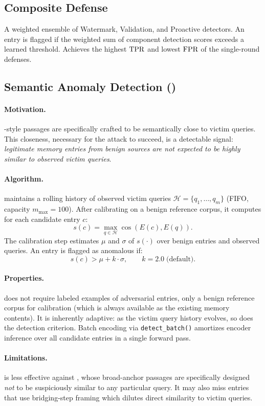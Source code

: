 \subsection{Composite Defense}

A weighted ensemble of Watermark, Validation, and Proactive detectors.
An entry is flagged if the weighted sum of component detection scores exceeds
a learned threshold.  Achieves the highest $\text{TPR}$ and lowest $\text{FPR}$ of the
single-round defenses.

\subsection{Semantic Anomaly Detection (\sad{})}
\label{sec:sad}

\paragraph{Motivation.}
\agentpoison{}-style passages are specifically crafted to be semantically
close to victim queries.  This closeness, necessary for the attack to succeed,
is a detectable signal: \emph{legitimate memory entries from benign sources
are not expected to be highly similar to observed victim queries}.

\paragraph{Algorithm.}
\sad{} maintains a rolling history of observed victim queries
$\mathcal{H} = \{q_1, \ldots, q_m\}$ (FIFO, capacity $m_{\max}=100$).
After calibrating on a benign reference corpus, it computes for each
candidate entry $c$:
\begin{equation}
  s(c) = \max_{q \in \mathcal{H}} \cos(E(c), E(q)).
  \label{eq:sad_score}
\end{equation}
The calibration step estimates $\mu$ and $\sigma$ of $s(\cdot)$ over benign
entries and observed queries.  An entry is flagged as anomalous if:
\begin{equation}
  s(c) > \mu + k \cdot \sigma, \qquad k = 2.0\;\text{(default)}.
  \label{eq:sad_threshold}
\end{equation}

\paragraph{Properties.}
\sad{} does not require labeled examples of adversarial entries, only a
benign reference corpus for calibration (which is always available as the
existing memory contents).  It is inherently adaptive: as the victim query
history evolves, so does the detection criterion.  Batch encoding via
\texttt{detect\_batch()} amortizes encoder inference over all candidate
entries in a single forward pass.

\paragraph{Limitations.}
\sad{} is less effective against \injecmem{}, whose broad-anchor passages are
specifically designed \emph{not} to be suspiciously similar to any particular
query.  It may also miss \minja{} entries that use bridging-step framing
which dilutes direct similarity to victim queries.
